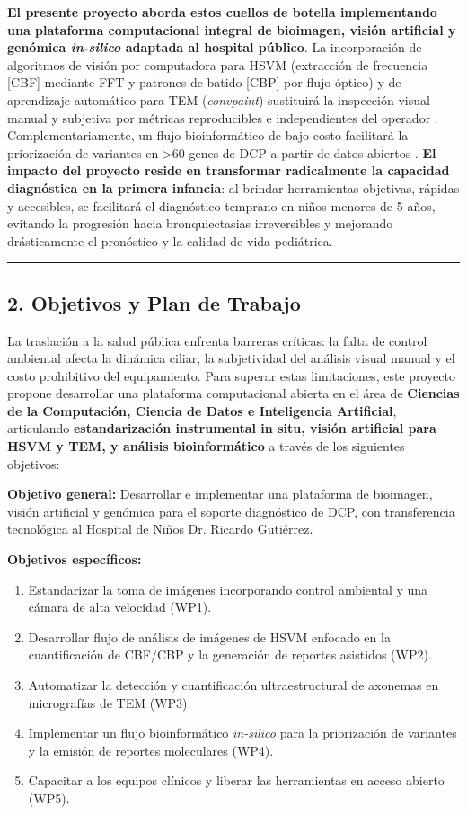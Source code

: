 \documentclass[11pt,letterpaper]{article}
\begin{document}
\textbf{El presente proyecto aborda estos cuellos de botella implementando una plataforma computacional integral de bioimagen, visión artificial y genómica \textit{in-silico} adaptada al hospital público}. La incorporación de algoritmos de visión por computadora para HSVM (extracción de frecuencia [CBF] mediante FFT y patrones de batido [CBP] por flujo óptico) y de aprendizaje automático para TEM (\textit{convpaint}) sustituirá la inspección visual manual y subjetiva por métricas reproducibles e independientes del operador \cite{Bricmont2021,Wrona2025}. Complementariamente, un flujo bioinformático de bajo costo facilitará la priorización de variantes en >60 genes de DCP a partir de datos abiertos \cite{Paff2021,Collison2025}. \textbf{El impacto del proyecto reside en transformar radicalmente la capacidad diagnóstica en la primera infancia}: al brindar herramientas objetivas, rápidas y accesibles, se facilitará el diagnóstico temprano en niños menores de 5 años, evitando la progresión hacia bronquiectasias irreversibles y mejorando drásticamente el pronóstico y la calidad de vida pediátrica.

\medskip\hrule\medskip

\subsection*{2. Objetivos y Plan de Trabajo}

La traslación a la salud pública enfrenta barreras críticas: la falta de control ambiental afecta la dinámica ciliar, la subjetividad del análisis visual manual y el costo prohibitivo del equipamiento. Para superar estas limitaciones, este proyecto propone desarrollar una plataforma computacional abierta en el área de \textbf{Ciencias de la Computación, Ciencia de Datos e Inteligencia Artificial}, articulando \textbf{estandarización instrumental in situ, visión artificial para HSVM y TEM, y análisis bioinformático} a través de los siguientes objetivos:

\textbf{Objetivo general:} Desarrollar e implementar una plataforma de bioimagen, visión artificial y genómica para el soporte diagnóstico de DCP, con transferencia tecnológica al Hospital de Niños Dr. Ricardo Gutiérrez.

\textbf{Objetivos específicos:}
\begin{enumerate}[noitemsep]
    \item Estandarizar la toma de imágenes incorporando control ambiental y una cámara de alta velocidad (WP1).
    \item Desarrollar flujo de análisis de imágenes de HSVM enfocado en la cuantificación de CBF/CBP y la generación de reportes asistidos (WP2).
    \item Automatizar la detección y cuantificación ultraestructural de axonemas en micrografías de TEM (WP3).
    \item Implementar un flujo bioinformático \textit{in-silico} para la priorización de variantes y  la emisión de reportes moleculares (WP4).
    \item Capacitar a los equipos clínicos y liberar las herramientas en acceso abierto (WP5).
\end{enumerate}
\end{document}
